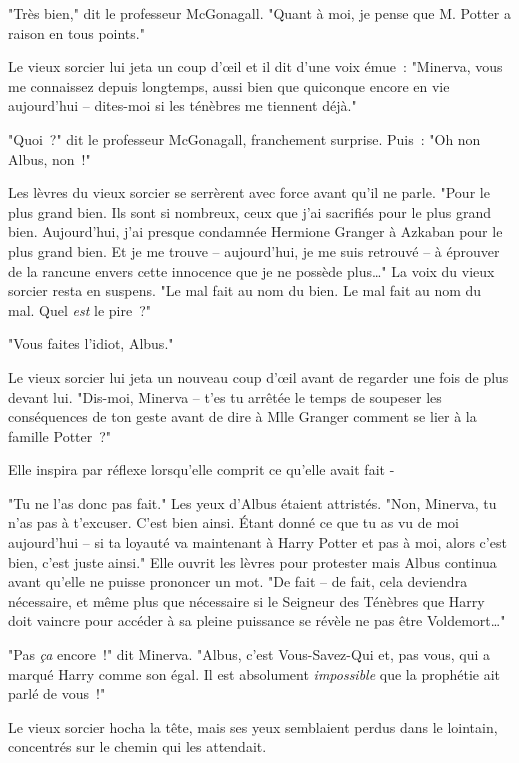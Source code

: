 "Très bien," dit le professeur McGonagall. "Quant à moi, je pense que M. Potter a raison en tous points."

Le vieux sorcier lui jeta un coup d'œil et il dit d'une voix émue~: "Minerva, vous me connaissez depuis longtemps, aussi bien que quiconque encore en vie aujourd'hui -- dites-moi si les ténèbres me tiennent déjà."

"Quoi~?" dit le professeur McGonagall, franchement surprise. Puis~: "Oh non Albus, non~!"

Les lèvres du vieux sorcier se serrèrent avec force avant qu'il ne parle. "Pour le plus grand bien. Ils sont si nombreux, ceux que j'ai sacrifiés pour le plus grand bien. Aujourd'hui, j'ai presque condamnée Hermione Granger à Azkaban pour le plus grand bien. Et je me trouve -- aujourd'hui, je me suis retrouvé -- à éprouver de la rancune envers cette innocence que je ne possède plus…" La voix du vieux sorcier resta en suspens. "Le mal fait au nom du bien. Le mal fait au nom du mal. Quel \emph{est} le pire~?"

"Vous faites l'idiot, Albus."

Le vieux sorcier lui jeta un nouveau coup d'œil avant de regarder une fois de plus devant lui. "Dis-moi, Minerva -- t'es tu arrêtée le temps de soupeser les conséquences de ton geste avant de dire à Mlle Granger comment se lier à la famille Potter~?"

Elle inspira par réflexe lorsqu'elle comprit ce qu'elle avait fait -

"Tu ne l'as donc pas fait." Les yeux d'Albus étaient attristés. "Non, Minerva, tu n'as pas à t'excuser. C'est bien ainsi. Étant donné ce que tu as vu de moi aujourd'hui -- si ta loyauté va maintenant à Harry Potter et pas à moi, alors c'est bien, c'est juste ainsi." Elle ouvrit les lèvres pour protester mais Albus continua avant qu'elle ne puisse prononcer un mot. "De fait -- de fait, cela deviendra nécessaire, et même plus que nécessaire si le Seigneur des Ténèbres que Harry doit vaincre pour accéder à sa pleine puissance se révèle ne pas être Voldemort…"

"Pas \emph{ça} encore~!" dit Minerva. "Albus, c'est Vous-Savez-Qui et, pas vous, qui a marqué Harry comme son égal. Il est absolument \emph{impossible} que la prophétie ait parlé de vous~!"

Le vieux sorcier hocha la tête, mais ses yeux semblaient perdus dans le lointain, concentrés sur le chemin qui les attendait.

\later

